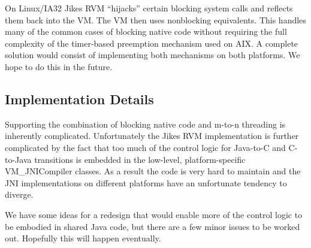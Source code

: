 On Linux/IA32 Jikes RVM ``hijacks'' certain blocking system calls and
reflects them back into the VM. The VM then uses nonblocking
equivalents. This handles many of the common cases of blocking native
code without requiring the full complexity of the timer-based
preemption mechanism used on AIX. A complete solution would consist of
implementing both mechanisms on both platforms.  We hope to do this in
the future.

\subsection{Implementation Details}
Supporting the combination of blocking native code and m-to-n
threading is inherently complicated.  Unfortunately the Jikes RVM
implementation is further complicated by the fact that too much of the
control logic for Java-to-C and C-to-Java transitions is embedded in
the low-level, platform-specific {VM\_JNICompiler} classes. As a
result the code is very hard to maintain and the JNI implementations
on different platforms have an unfortunate tendency to diverge. 

We have some ideas for a redesign that would enable more of the
control logic to be embodied in shared Java code, but there are a few
minor issues to be worked out. Hopefully this will happen eventually.
